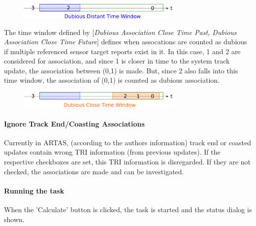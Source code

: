 \begin{figure}[H]
  \center
    \includegraphics[width=8cm]{../screenshots/artas_assoc_dubious_distant_window.png}
\end{figure}


The time window defined by [\textit{Dubious Association Close Time Past, Dubious Association Close Time Future}] defines when assocations are counted as dubious if multiple referenced sensor target reports exist in it. In this case, 1 and 2 are considered for association, and since 1 is closer in time to the system track update, the association between (0,1) is made. But, since 2 also falls into this time window, the association of (0,1) is counted as dubious association.

\begin{figure}[H]
  \center
    \includegraphics[width=8cm]{../screenshots/artas_assoc_dubious_close_window.png}
\end{figure}


\paragraph{Ignore Track End/Coasting Associations}

Currently in ARTAS, (according to the authors information) track end or coasted updates contain wrong TRI information (from previous updates). If the respective checkboxes are set, this TRI information is disregarded. If they are not checked, the associations are made and can be investigated.

\paragraph{Running the task}
When the 'Calculate' button is clicked, the task is started and the status dialog is shown.


